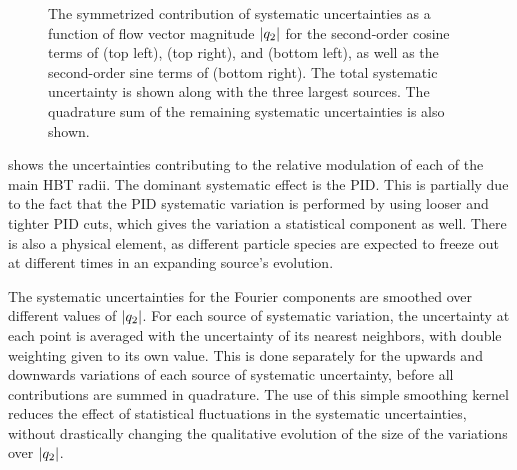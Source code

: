 \begin{figure}[t]
\caption{The symmetrized contribution of systematic uncertainties as a function of flow vector magnitude $|q_{2}|$ for the second-order cosine terms of \Rout (top left), \Rside (top right), and \Rlong (bottom left), as well as the second-order sine terms of \Ros (bottom right). The total systematic uncertainty is shown along with the three largest sources. The quadrature sum of the remaining systematic uncertainties is also shown.}
\label{fig:azi_syst_breakdown}
\end{figure}

 shows the uncertainties contributing to the relative modulation of each of the main HBT radii. The dominant systematic effect is the \ac{PID}. This is partially due to the fact that the \ac{PID} systematic variation is performed by using looser and tighter \ac{PID} cuts, which gives the variation a statistical component as well. There is also a physical element, as different particle species are expected to freeze out at different times in an expanding source's evolution.

The systematic uncertainties for the Fourier components are smoothed over different values of $|q_{2}|$. For each source of systematic variation, the uncertainty at each point is averaged with the uncertainty of its nearest neighbors, with double weighting given to its own value. This is done separately for the upwards and downwards variations of each source of systematic uncertainty, before all contributions are summed in quadrature. The use of this simple smoothing kernel reduces the effect of statistical fluctuations in the systematic uncertainties, without drastically changing the qualitative evolution of the size of the variations over $|q_{2}|$.
